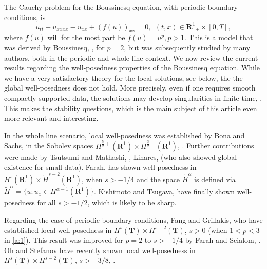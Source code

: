 \documentclass[final,11pt,leqno]{amsart}
\begin{document}
The Cauchy problem for the Boussinesq equation, with periodic boundary conditions, is
\begin{equation}
\label{a:1}
u_{tt}+u_{xxxx}-u_{xx}+(f(u))_{xx}=0, \ \ (t,x)\in {\mathbf R^1}_+\times [0,T],
\end{equation}
where $f(u)$ will for the most part be $f(u)=u^p, p>1$. This is a model  that was derived by Boussinesq, \cite{Bous}, for $p=2$, but was subsequently studied
by many authors, both in the periodic and whole line context. We now review the current results regarding  the well-posedness properties of the Boussinesq equation.
While we have a very satisfactory theory for the local solutions, see below, the  the  global well-posedness does not hold. More precisely, even if one requires smooth
compactly supported data, the solutions may develop singularities in finite time, \cite{Bona}. This makes the stability questions, which is the main subject of this
article even more relevant and interesting.

In the whole line scenario, local well-posedness was established by Bona and Sachs,  in the Sobolev spaces
$H^{{\frac{{5}}{{2}}}+}({\mathbf R^1})\times  H^{{\frac{{3}}{{2}}}+}({\mathbf R^1})$, \cite{Bona}.   Further contributions were made by Tsutsumi and Mathashi, \cite{TM},  Linares, \cite{Linares}
(who also showed global existence for small data). Farah, \cite{Farah} has shown well-posedness in $H^s({\mathbf R^1})\times \tilde{H}^{s-2}({\mathbf R^1})$, when $s>-1/4$ and
the space $\tilde{H}^{\alpha}$ is defined via  $\tilde{H}^{\alpha}=\{u: u_x \in H^{{\alpha}-1}({\mathbf R^1})\}$.   Kishimoto and Tsugava, \cite{KT}  have finally shown well-posedness
for all $s>-1/2$, which is likely to be sharp.

Regarding the case of periodic boundary conditions, Fang and Grillakis, \cite{FG} who have established local well-posedness in $H^s({\mathbf T})\times H^{s-2}({\mathbf T})$, $s>0$ (when
  $1<p<3$ in \eqref{a:1}).  This result was  improved for $p=2$ to $s>-1/4$  by Farah and Scialom, \cite{FS}. Oh and Stefanov have recently shown
  local well-posedness in $H^s({\mathbf T})\times H^{s-2}({\mathbf T})$, $s>-3/8$, \cite{OS}.
\end{document}
